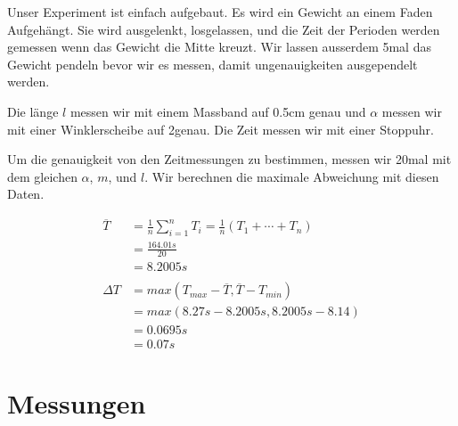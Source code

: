 \documentclass[12pt, a4paper, twoside]{article}
\begin{document}
Unser Experiment ist einfach aufgebaut.
Es wird ein Gewicht an einem Faden Aufgehängt.
Sie wird ausgelenkt, losgelassen, und die Zeit der Perioden werden gemessen wenn das Gewicht die Mitte kreuzt.
Wir lassen ausserdem 5mal das Gewicht pendeln bevor wir es messen, damit ungenauigkeiten ausgependelt werden.

Die länge $l$ messen wir mit einem Massband auf 0.5cm genau und $\alpha$ messen wir mit einer Winklerscheibe auf 2\textdegree genau.
Die Zeit messen wir mit einer Stoppuhr.

Um die genauigkeit von den Zeitmessungen zu bestimmen, messen wir 20mal mit dem gleichen $\alpha$, $m$, und $l$.
Wir berechnen die maximale Abweichung mit diesen Daten.



\begin{align*}
  \overline{T} & = \frac{1}{n} \sum_{i=1}^{n} T_{i}=\frac{1}{n}\left(T_{1}+\cdots+T_{n}\right) \\
               & =\frac{164.01s}{20}                                                           \\
               & =8.2005s                                                                      \\
  \\
  \Delta T     & = max(T_{max} - \overline{T}, \overline{T} - T_{min})                         \\
               & = max(8.27s - 8.2005s, 8.2005s - 8.14)                                        \\
               & = 0.0695s                                                                     \\
               & = 0.07s
\end{align*}

\vfill\pagebreak

\section{Messungen}
\end{document}
